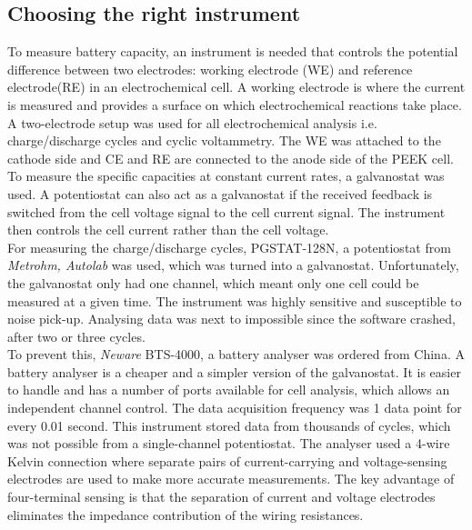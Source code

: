 \subsection*{Choosing the right instrument}
To measure battery capacity, an instrument is needed that controls the potential difference between two electrodes: working electrode (WE) and reference electrode(RE) in an electrochemical cell. A working electrode is where the current is measured and provides a surface on which electrochemical reactions take place. A two-electrode setup was used for all electrochemical analysis i.e. charge/discharge cycles and cyclic voltammetry. The WE was attached to the cathode side and CE and RE are connected to the anode side of the PEEK cell. To measure the specific capacities at constant current rates, a galvanostat was used. A potentiostat can also act as a galvanostat if the received feedback is switched from the cell voltage signal to the cell current signal. The instrument then controls the cell current rather than the cell voltage. \\
For measuring the charge/discharge cycles, PGSTAT-128N, a potentiostat from \textit{Metrohm, Autolab} was used, which was turned into a galvanostat. Unfortunately, the galvanostat only had one channel, which meant only one cell could be measured at a given time. The instrument was highly sensitive and susceptible to noise pick-up. Analysing data was next to impossible since the software crashed, after two or three cycles. \\
To prevent this, \textit{Neware} BTS-4000, a battery analyser was ordered from China. A battery analyser is a cheaper and a simpler version of the galvanostat. It is easier to handle and has a number of ports available for cell analysis, which allows an independent channel control. The data acquisition frequency was 1 data point for every 0.01 second. This instrument stored data from thousands of cycles, which was not possible from a single-channel potentiostat. The analyser used a 4-wire Kelvin connection where separate pairs of current-carrying and voltage-sensing electrodes are used to make more accurate measurements. The key advantage of four-terminal sensing is that the separation of current and voltage electrodes eliminates the impedance contribution of the wiring resistances. 
